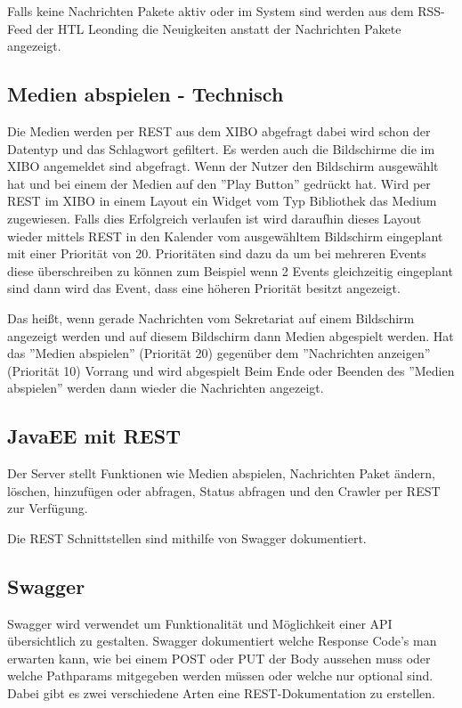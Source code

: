 Falls keine Nachrichten Pakete aktiv oder im System sind werden aus dem RSS-Feed der HTL Leonding die Neuigkeiten anstatt der Nachrichten Pakete angezeigt.

\subsection{Medien abspielen - Technisch}\label{sec:playmediatechnical}
Die Medien werden per REST aus dem XIBO abgefragt dabei wird schon der Datentyp und das Schlagwort gefiltert. Es werden auch die Bildschirme die im XIBO angemeldet sind abgefragt. Wenn der Nutzer den Bildschirm ausgewählt hat und bei einem der Medien auf den ''Play Button'' gedrückt hat. Wird per REST im XIBO in einem Layout ein Widget vom Typ Bibliothek das Medium zugewiesen. Falls dies Erfolgreich verlaufen ist wird daraufhin dieses Layout wieder mittels REST in den Kalender vom ausgewähltem Bildschirm eingeplant mit einer Priorität von 20. Prioritäten sind dazu da um bei mehreren Events diese überschreiben zu können zum Beispiel wenn 2 Events gleichzeitig eingeplant sind dann wird das Event, dass eine höheren Priorität besitzt angezeigt.

Das heißt, wenn gerade Nachrichten vom Sekretariat auf einem Bildschirm angezeigt werden und auf diesem Bildschirm dann Medien abgespielt werden. Hat das ''Medien abspielen'' (Priorität 20) gegenüber dem ''Nachrichten anzeigen'' (Priorität 10) Vorrang und wird abgespielt Beim Ende oder Beenden des ''Medien abspielen'' werden dann wieder die Nachrichten angezeigt.

\subsection{JavaEE mit REST}\label{sec:javaeeresttechnical}
Der Server stellt Funktionen wie Medien abspielen, Nachrichten Paket ändern, löschen, hinzufügen oder abfragen, Status abfragen und den Crawler per REST zur Verfügung.

Die REST Schnittstellen sind mithilfe von Swagger dokumentiert. \pageref{sec:javaeeandroidrestswagger}

\subsection{Swagger}\label{sec:javaeeandroidrestswagger}
Swagger wird verwendet um Funktionalität und Möglichkeit einer API übersichtlich zu gestalten. Swagger dokumentiert welche Response Code's man erwarten kann, wie bei einem POST oder PUT der Body aussehen muss oder welche Pathparams mitgegeben werden müssen oder welche nur optional sind. Dabei gibt es zwei verschiedene Arten eine REST-Dokumentation zu erstellen.

